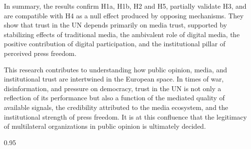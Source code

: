\documentclass[english]{textolivre}
\begin{document}
In summary, the results confirm H1a, H1b, H2 and H5, partially validate H3, and are compatible with H4 as a null effect produced by opposing mechanisms. They show that trust in the UN depends primarily on media trust, supported by stabilizing effects of traditional media, the ambivalent role of digital media, the positive contribution of digital participation, and the institutional pillar of perceived press freedom.

This research contributes to understanding how public opinion, media, and institutional trust are intertwined in the European space. In times of war, disinformation, and pressure on democracy, trust in the UN is not only a reflection of its performance but also a function of the mediated quality of available signals, the credibility attributed to the media ecosystem, and the institutional strength of press freedom. It is at this confluence that the legitimacy of multilateral organizations in public opinion is ultimately decided.

\begin{spacing}{0.95} 
\printbibliography\label{sec-bib}
\end{spacing}



\begin{dataavailability}
\end{dataavailability}
\end{document}
